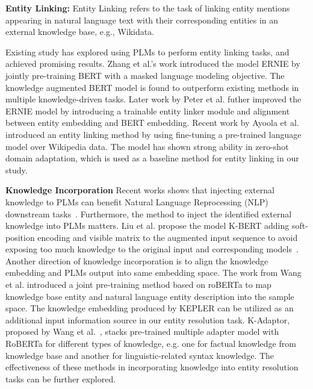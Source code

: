 \textbf{Entity Linking:}
Entity Linking \cite{li_deep_2020} refers to the task of linking entity mentions appearing in natural language text with their corresponding entities in an external knowledge base, e.g., Wikidata. 


Existing study has explored using PLMs to perform entity linking tasks, and achieved promising results. 
Zhang et al.'s work \cite{zhang_ernie_2019} introduced the model ERNIE by jointly pre-training BERT with a masked language modeling objective. The knowledge augmented BERT model is found to outperform existing methods in multiple knowledge-driven tasks. 
Later work by Peter et al. \cite{peters_knowledge_2019} futher improved the ERNIE model by introducing a trainable entity linker module and alignment between entity embedding and BERT embedding. 
Recent work by Ayoola et al. \cite{ayoola_refined_2022} introduced an entity linking method by using fine-tuning a pre-trained language model over Wikipedia data. The model has shown strong ability in zero-shot domain adaptation, which is used as a baseline method for entity linking in our study. 

\textbf{Knowledge Incorporation} %
Recent works shows that injecting external knowledge to PLMs can benefit Natural Language Reprocessing (NLP) downstream tasks~\cite{zhang_ernie_2019,peters_knowledge_2019,liu_k-bert_2020,wang_k-adapter_2021, wang_kepler_2021}. Furthermore, the method to inject the identified external knowledge into PLMs matters. Liu et al. propose the model K-BERT adding soft-position encoding and visible matrix to the augmented input sequence to avoid exposing too much knowledge to the original input and corresponding models~\cite{liu_k-bert_2020}. Another direction of knowledge incorporation is to align the knowledge embedding and PLMs output into same embedding space. The work from Wang et al. \cite{wang_kepler_2021} introduced a joint pre-training method based on roBERTa to map knowledge base entity and natural language entity description into the sample space. The knowledge embedding produced by KEPLER can be utilized as an additional input information source in our entity resolution task. K-Adaptor, proposed by Wang et al.~\cite{wang_k-adapter_2021}, stacks pre-trained multiple adapter model with RoBERTa for different types of knowledge, e.g. one for factual knowledge from knowledge base and another for linguistic-related syntax knowledge. The effectiveness of these methods in incorporating knowledge into entity resolution tasks can be further explored.
